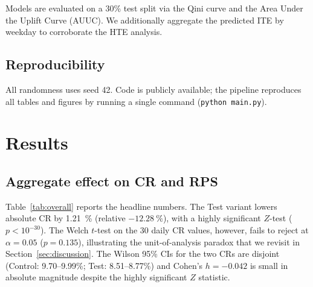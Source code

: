 \documentclass[pdflatex,sn-mathphys-num]{sn-jnl}
\theoremstyle{thmstyleone}
\theoremstyle{thmstyletwo}
\theoremstyle{thmstylethree}
\begin{document}
Models are evaluated on a 30\% test split via the Qini curve and the Area Under
the Uplift Curve (AUUC). We additionally aggregate the predicted ITE by weekday
to corroborate the HTE analysis.

\subsection{Reproducibility}\label{subsec:methods-repro}

All randomness uses seed 42. Code is publicly available; the pipeline reproduces
all tables and figures by running a single command (\texttt{python main.py}).

\section{Results}\label{sec:results}

\subsection{Aggregate effect on CR and RPS}\label{subsec:results-aggregate}

Table~\ref{tab:overall} reports the headline numbers.
The Test variant lowers absolute CR by \SI{1.21}{\percent} (relative $-\SI{12.28}{\percent}$),
with a highly significant $Z$-test ($p<10^{-30}$). The Welch $t$-test on the 30
daily CR values, however, fails to reject at $\alpha=0.05$ ($p=0.135$),
illustrating the unit-of-analysis paradox \cite{larsen2024statistical} that we revisit
in Section~\ref{sec:discussion}. The Wilson 95\% CIs for the two CRs are disjoint
(Control: 9.70--9.99\%; Test: 8.51--8.77\%) and Cohen's $h=-0.042$ is small
in absolute magnitude despite the highly significant $Z$ statistic.
\end{document}
